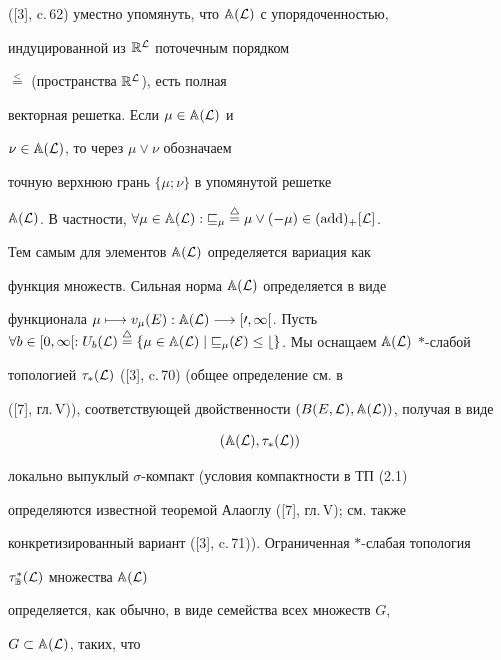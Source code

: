 ([3], c.\,62) уместно упомянуть, что $\Bbb A(\cal L)$ с упорядоченностью,


индуцированной из $\Bbb R^{\cal L}$ поточечным порядком


$\overset{<}{=}$ (пространства $\Bbb R^{\cal L}$), есть полная


векторная решетка. Если $\mu\in\Bbb A(\cal L)$ и


$\nu\in\Bbb A(\cal L)$, то через $\mu\vee\nu$ обозначаем


точную верхнюю грань $\{\mu;\nu\}$ в упомянутой решетке


$\Bbb A(\cal L)$. В частности, $\forall\mu\in\Bbb A(\cal L):


v_\mu\overset{\triangle}{=}\mu\vee(-\mu)\in(\add)_+[\cal L]$.


Тем самым для элементов $\Bbb A(\cal L)$ определяется вариация как


функция множеств. Сильная норма $\Bbb A(\cal L)$ определяется в виде


функционала $\mu\longmapsto v_\mu(E):\Bbb A(\cal L)


\longrightarrow [0,\infty[$. Пусть $\forall b\in[0,\infty[:


U_b(\cal L)\overset{\triangle}{=}\{\mu\in\Bbb A(\cal L)


\mid v_\mu(E)\le b\}$. Мы оснащаем $\Bbb A(\cal L)$ $*$-слабой


топологией $\tau_*(\cal L)$ ([3], c.\,70) (общее определение см. в


([7], гл.\,V)), соответствующей двойственности $(B(E,\cal L),


\Bbb A(\cal L))$, получая в виде


\begin{equation}


(\Bbb A(\cal L),\tau_*(\cal L))


\end{equation}


локально выпуклый $\sigma$-компакт (условия компактности в ТП (2.1)


определяются известной теоремой Алаоглу ([7], гл.\,V); см. также


конкретизированный вариант ([3], c.\,71)). Ограниченная $*$-слабая топология


$\tau^*_{\Bbb B}(\cal L)$ множества $\Bbb A(\cal L)$


определяется, как обычно, в виде семейства всех множеств $G$,


$G\subset\Bbb A(\cal L)$, таких, что


